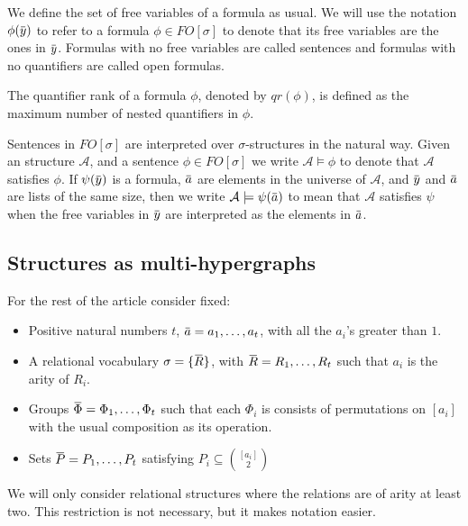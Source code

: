 \documentclass[12pt,notitlepage,a4paper]{article}
\theoremstyle{definition}
\newcommand{\overbar}[1]{\mkern 1.5mu\overline{\mkern-1.5mu#1\mkern-1.5mu}\mkern 1.5mu}
\begin{document}
We define the set of free variables of a formula as usual. 
We will use the notation $\phi(\overbar{y})$ to refer to a 
formula $\phi\in FO[\sigma]$
to denote that its free variables are the ones in $\overbar{y}$.
Formulas with no free variables are called sentences and 
formulas with no quantifiers are called open formulas. \par
The quantifier rank of a formula $\phi$, denoted by $qr(\phi)$, 
is defined as the maximum number of nested quantifiers in $\phi$. \par
Sentences in $FO[\sigma]$ are interpreted over $\sigma$-structures
in the natural way. Given an structure $\mathcal{A}$, and a sentence
$\phi\in FO[\sigma]$ we write $\mathcal{A} \models \phi$ to denote 
that $\mathcal{A}$ satisfies $\phi$. If $\psi(\overbar{y})$ is a
formula, $\overbar{a}$ are elements in the universe of 
$\mathcal{A}$, and $\overbar{y}$ and $\overbar{a}$ are lists of the same size,
then we write $\mathcal{A} \models 
\psi(\overbar{a})$
to mean that $\mathcal{A}$ satisfies $\psi$ when the free variables in
$\overbar{y}$ are interpreted as the elements in $\overbar{a}$.


\subsection{Structures as multi-hypergraphs}

For the rest of the article consider fixed:
\begin{itemize}
	\item Positive natural numbers $t$, $\overbar{a}=a_1,\dots, a_t$, with 
	all the $a_i$'s greater than $1$.\
	
	\item A relational vocabulary $\sigma=\{\overbar{R}\}$, with
	$\overbar{R}=R_1,\dots, R_t$ such that $a_i$ is the arity of
	$R_i$. 
	
	\item 
	Groups $\overbar{\Phi}=\Phi_1,\dots,\Phi_t$
	such that each $\Phi_i$ is consists of 
	permutations on $[a_i]$ with the usual 
	composition as its operation.
	
	\item 
	Sets $\overbar{P}=P_1, \dots, P_t$ satisfying 
	$P_i\subseteq \binom{[a_i]}{2}$
	
	
\end{itemize}

We will only consider relational structures where the relations
are of arity at least two. This restriction is not necessary, but 
it makes notation easier. 
\end{document}
